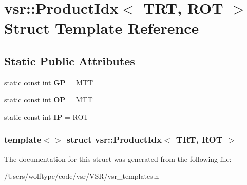 \hypertarget{structvsr_1_1_product_idx_3_01_t_r_t_00_01_r_o_t_01_4}{\section{vsr\-:\-:Product\-Idx$<$ T\-R\-T, R\-O\-T $>$ Struct Template Reference}
\label{structvsr_1_1_product_idx_3_01_t_r_t_00_01_r_o_t_01_4}
}
\subsection*{Static Public Attributes}
\begin{DoxyCompactItemize}
\item 
\hypertarget{structvsr_1_1_product_idx_3_01_t_r_t_00_01_r_o_t_01_4_a7e332c0287e205cf4522b81b54f49004}{static const int {\bfseries G\-P} = M\-T\-T}\label{structvsr_1_1_product_idx_3_01_t_r_t_00_01_r_o_t_01_4_a7e332c0287e205cf4522b81b54f49004}

\item 
\hypertarget{structvsr_1_1_product_idx_3_01_t_r_t_00_01_r_o_t_01_4_a6d9448280e4ef0088726adbf9ce964a9}{static const int {\bfseries O\-P} = M\-T\-T}\label{structvsr_1_1_product_idx_3_01_t_r_t_00_01_r_o_t_01_4_a6d9448280e4ef0088726adbf9ce964a9}

\item 
\hypertarget{structvsr_1_1_product_idx_3_01_t_r_t_00_01_r_o_t_01_4_a56a724612b8b8701173250d157ad2463}{static const int {\bfseries I\-P} = R\-O\-T}\label{structvsr_1_1_product_idx_3_01_t_r_t_00_01_r_o_t_01_4_a56a724612b8b8701173250d157ad2463}

\end{DoxyCompactItemize}
\subsubsection*{template$<$$>$ struct vsr\-::\-Product\-Idx$<$ T\-R\-T, R\-O\-T $>$}



The documentation for this struct was generated from the following file\-:\begin{DoxyCompactItemize}
\item 
/\-Users/wolftype/code/vsr/\-V\-S\-R/vsr\-\_\-templates.\-h\end{DoxyCompactItemize}
